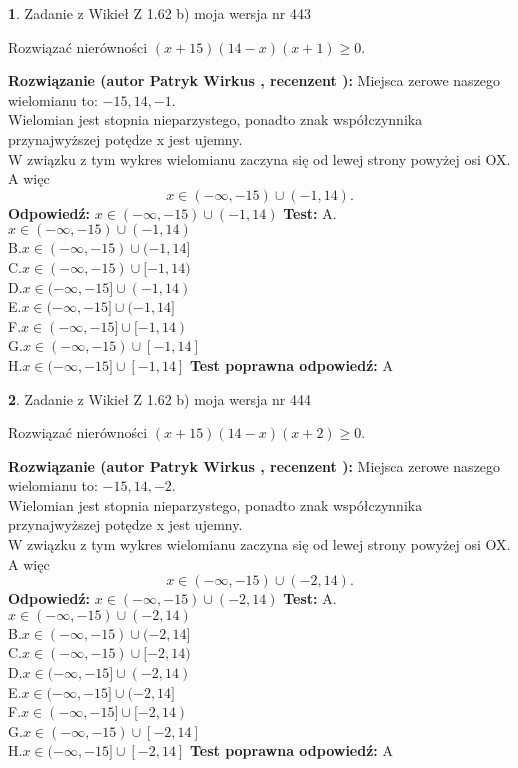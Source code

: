 \documentclass[12pt, a4paper]{article}
\theoremstyle{definition} %
\newtheorem{zad}{}
\newcommand{\zadStart}[1]{\begin{zad}#1\newline}
\newcommand{\zadStop}{\end{zad}}
\newcommand{\rozwStart}[2]{\noindent \textbf{Rozwiązanie (autor #1 , recenzent #2): }\newline}
\newcommand{\rozwStop}{\newline}
\newcommand{\odpStart}{\noindent \textbf{Odpowiedź:}\newline}
\newcommand{\odpStop}{\newline}
\newcommand{\testStart}{\noindent \textbf{Test:}\newline}
\newcommand{\testStop}{\newline}
\newcommand{\kluczStart}{\noindent \textbf{Test poprawna odpowiedź:}\newline}
\newcommand{\kluczStop}{\newline}
\begin{document}
\zadStart{Zadanie z Wikieł Z 1.62 b) moja wersja nr 443}

Rozwiązać nierówności $(x+15)(14-x)(x+1)\ge0$.
\zadStop
\rozwStart{Patryk Wirkus}{}
Miejsca zerowe naszego wielomianu to: $-15, 14, -1$.\\
Wielomian jest stopnia nieparzystego, ponadto znak współczynnika przy\linebreak najwyższej potędze x jest ujemny.\\ W związku z tym wykres wielomianu zaczyna się od lewej strony powyżej osi OX. A więc $$x \in (-\infty,-15) \cup (-1,14).$$
\rozwStop
\odpStart
$x \in (-\infty,-15) \cup (-1,14)$
\odpStop
\testStart
A.$x \in (-\infty,-15) \cup (-1,14)$\\
B.$x \in (-\infty,-15) \cup (-1,14]$\\
C.$x \in (-\infty,-15) \cup [-1,14)$\\
D.$x \in (-\infty,-15] \cup (-1,14)$\\
E.$x \in (-\infty,-15] \cup (-1,14]$\\
F.$x \in (-\infty,-15] \cup [-1,14)$\\
G.$x \in (-\infty,-15) \cup [-1,14]$\\
H.$x \in (-\infty,-15] \cup [-1,14]$
\testStop
\kluczStart
A
\kluczStop



\zadStart{Zadanie z Wikieł Z 1.62 b) moja wersja nr 444}

Rozwiązać nierówności $(x+15)(14-x)(x+2)\ge0$.
\zadStop
\rozwStart{Patryk Wirkus}{}
Miejsca zerowe naszego wielomianu to: $-15, 14, -2$.\\
Wielomian jest stopnia nieparzystego, ponadto znak współczynnika przy\linebreak najwyższej potędze x jest ujemny.\\ W związku z tym wykres wielomianu zaczyna się od lewej strony powyżej osi OX. A więc $$x \in (-\infty,-15) \cup (-2,14).$$
\rozwStop
\odpStart
$x \in (-\infty,-15) \cup (-2,14)$
\odpStop
\testStart
A.$x \in (-\infty,-15) \cup (-2,14)$\\
B.$x \in (-\infty,-15) \cup (-2,14]$\\
C.$x \in (-\infty,-15) \cup [-2,14)$\\
D.$x \in (-\infty,-15] \cup (-2,14)$\\
E.$x \in (-\infty,-15] \cup (-2,14]$\\
F.$x \in (-\infty,-15] \cup [-2,14)$\\
G.$x \in (-\infty,-15) \cup [-2,14]$\\
H.$x \in (-\infty,-15] \cup [-2,14]$
\testStop
\kluczStart
A
\kluczStop
\end{document}
